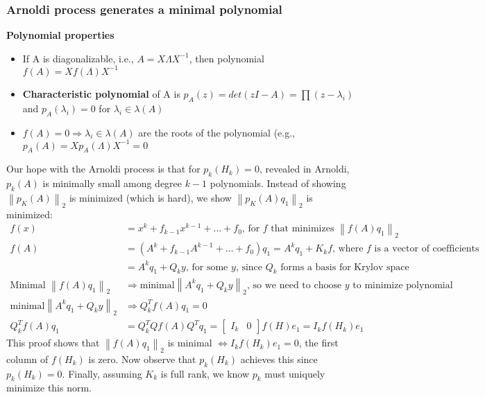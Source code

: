 \documentclass{article}
\newcommand{\norm}[2]{\left\lVert#1\right\rVert_#2}
\begin{document}
\subsubsection{Arnoldi process generates a minimal polynomial}
\textbf{Polynomial properties}
\begin{itemize}
    \item If A is diagonalizable, i.e., $A = X\Lambda X^{-1}$, then polynomial $f(A) = Xf(\Lambda)X^{-1}$
    \item \textbf{Characteristic polynomial} of A is $p_A(z) = det(zI - A) = \prod(z - \lambda_i)$ and $p_A(\lambda_i) = 0$ for $\lambda_i \in \lambda(A)$
    \item $f(A) = 0 \Longrightarrow \lambda_i \in \lambda(A)$ are the roots of the polynomial (e.g., $p_A(A) = Xp_A(\Lambda)X^{-1} = 0$
\end{itemize}
Our hope with the Arnoldi process is that for $p_k(H_k) = 0$, revealed in Arnoldi, $p_k(A)$ is minimally small among degree $k-1$ polynomials. Instead of showing $\norm{p_K(A)}{2}$ is minimized (which is hard), we show $\norm{p_K(A)q_1}{2}$ is minimized:
\begin{align*}
    f(x) &= x^k + f_{k-1}x^{k-1} + \dots + f_0 \textrm{, for $f$ that minimizes } \norm{f(A)q_1}{2}\\
    f(A) &= (A^k + f_{k-1}A^{k-1} + \dots + f_0)q_1 = A^kq_1 + K_kf \textrm{, where $f$ is a vector of coefficients}\\
    &= A^kq_1 + Q_ky \textrm{, for some $y$, since $Q_k$ forms a basis for Krylov space}\\
    \textrm{Minimal }\norm{f(A)q_1}{2} &\Longrightarrow \textrm{minimal} \norm{A^kq_1 + Q_ky}{2} \textrm{, so we need to choose $y$ to minimize polynomial}\\
    \textrm{minimal} \norm{A^kq_1 + Q_ky}{2} & \Longrightarrow Q_k^Tf(A)q_1 = 0\\
    Q_k^Tf(A)q_1 &= Q_k^TQf(A)Q^Tq_1 = \begin{bmatrix} I_k & 0 \end{bmatrix} f(H)e_1 = I_kf(H_k)e_1
\end{align*}
This proof shows that $\norm{f(A)q_1}{2}$ is minimal $\Leftrightarrow I_kf(H_k)e_1=0$, the first column of $f(H_k)$ is zero. Now observe that $p_k(H_k)$ achieves this since $p_k(H_k) = 0$. Finally, assuming $K_k$ is full rank, we know $p_k$ must uniquely minimize this norm. 

\end{document}
